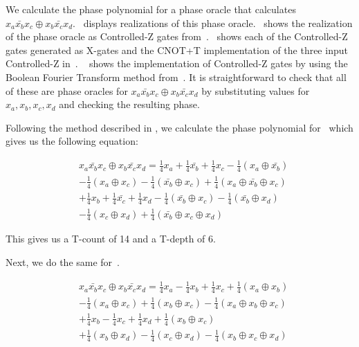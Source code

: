 \begin{example}
  \label{ex-series}
  We calculate the phase polynomial for a phase oracle that calculates
  $x_a \bar{x_b} x_c \oplus x_b \bar{x_c} x_d$.~ displays realizations of this phase
  oracle.~ shows the realization of the phase oracle as Controlled-Z gates
  from~.~ shows each of the Controlled-Z gates generated
  as X-gates and the CNOT+T implementation of the three input Controlled-Z in~.
  ~ shows the implementation of Controlled-Z gates by using the Boolean Fourier
  Transform method from~. It is straightforward to check that all of these are phase oracles for
  $x_a \bar{x_b} x_c \oplus x_b \bar{x_c} x_d$ by substituting values for $x_a,x_b,x_c,x_d$ and checking
  the resulting phase.

  Following the method described in , we calculate the phase polynomial
  for~ which gives us the following equation:

  \begin{equation}
    \label{eq-series1}
    \begin{aligned}
      &x_a \bar{x_b} x_c \oplus x_b \bar{x_c} x_d = \frac{1}{4}x_a + \frac{1}{4}\bar{x_b} 
      + \frac{1}{4}x_c - \frac{1}{4}(x_a \oplus \bar{x_b}) \\
      &- \frac{1}{4}(x_a \oplus x_c) - \frac{1}{4}(\bar{x_b} \oplus x_c)
      + \frac{1}{4}{(x_a \oplus \bar{x_b} \oplus x_c)} \\
      & +\frac{1}{4}x_b +\frac{1}{4}\bar{x_c} +\frac{1}{4}x_d 
        - \frac{1}{4}(\bar{x_b} \oplus x_c) - \frac{1}{4}(\bar{x_b} \oplus x_d) \\
      & - \frac{1}{4}(x_c \oplus x_d) + \frac{1}{4}(\bar{x_b} \oplus x_c \oplus x_d) 
    \end{aligned}
  \end{equation}

  
  This gives us a T-count of 14 and a T-depth of 6.

  Next, we do the same for~.
  
  \begin{equation}
    \label{eq-series}
    \begin{aligned}
      &x_a \bar{x_b} x_c \oplus x_b \bar{x_c} x_d = \frac{1}{4}x_a - \frac{1}{4}x_b + \frac{1}{4}x_c
      + \frac{1}{4}(x_a \oplus x_b) \\
      & - \frac{1}{4}(x_a \oplus x_c) + \frac{1}{4}(x_b \oplus x_c)
      - \frac{1}{4}(x_a \oplus x_b \oplus x_c)  \\
      & + \frac{1}{4}x_b - \frac{1}{4}x_c + \frac{1}{4}x_d
      + \frac{1}{4}(x_b \oplus x_c) \\
      & + \frac{1}{4}(x_b \oplus x_d) - \frac{1}{4}(x_c \oplus x_d)
      - \frac{1}{4}(x_b \oplus x_c \oplus x_d)  
    \end{aligned}
  \end{equation}
  

\end{example}
